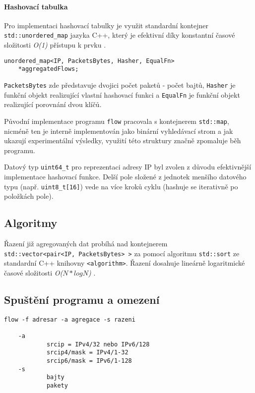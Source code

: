 \documentclass[12pt,a4paper,titlepage,final]{article}
\begin{document}
\paragraph{Hashovací tabulka}
Pro implementaci hashovací tabulky je využit standardní kontejner \texttt{std::unordered\_map} jazyka C++, který je efektivní díky konstantní časové složitosti \emph{O(1)} přístupu k prvku \cite{CPPunorderedMap}.

\begin{verbatim}
unordered_map<IP, PacketsBytes, Hasher, EqualFn> 
    *aggregatedFlows;
\end{verbatim}

\texttt{PacketsBytes} zde představuje dvojici počet paketů - počet bajtů, \texttt{Hasher} je funkční objekt realizující vlastní hashovací funkci a \texttt{EqualFn} je funkční objekt realizující porovnání dvou klíčů.

Původní implementace programu \texttt{flow} pracovala s kontejnerem \texttt{std::map}, nicméně ten je interně implementován jako binární vyhledávací strom a jak ukazují experimentální výsledky, využití této struktury značně zpomaluje běh programu.

Datový typ \texttt{uint64\_t} pro reprezentaci adresy IP byl zvolen z důvodu efektivnější implementace hashovací funkce. Delší pole složené z jednotek menšího datového typu (např. \texttt{uint8\_t[16]}) vede na více kroků cyklu (hashuje se iterativně po položkách pole).

\subsection{Algoritmy}
Řazení již agregovaných dat probíhá nad kontejnerem\\ \texttt{std::vector<pair<IP,~PacketsBytes>~>} za pomocí algoritmu \texttt{std::sort} ze standardní C++ knihovny \texttt{<algorithm>}. Řazení dosahuje lineárně logaritmické časové složitosti \emph{O($N*log N$)} \cite{CPPsort}.

\subsection{Spuštění programu a omezení}		
\begin{verbatim}
flow -f adresar -a agregace -s razeni

    -a
            srcip = IPv4/32 nebo IPv6/128
            srcip4/mask = IPv4/1-32
            srcip6/mask = IPv6/1-128
    -s
            bajty
            pakety
\end{verbatim}
\end{document}
